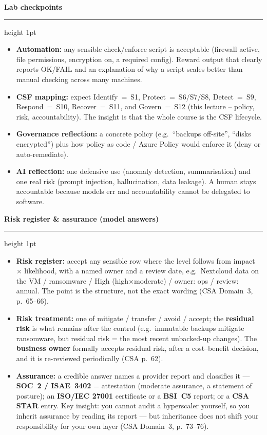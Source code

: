 \documentclass[11pt]{article}
\newcommand{\wbsection}[1]{\par\vspace{11pt}\noindent
  {\large\bfseries\color{kred}#1}\par\vspace{2pt}
  {\color{kred!35}\hrule height 1pt}\par\vspace{6pt}}
\renewcommand{\emph}[1]{\textup{#1}}
\begin{document}
\wbsection{Lab checkpoints}
\begin{itemize}
\item \textbf{Automation:} any sensible check/enforce script is acceptable (firewall active, file
      permissions, encryption on, a required config). Reward output that clearly reports OK/FAIL and an
      explanation of why a script scales better than manual checking across many machines.
\item \textbf{CSF mapping:} expect Identify~=~S1, Protect~=~S6/S7/S8, Detect~=~S9, Respond~=~S10,
      Recover~=~S11, and Govern~=~S12 (this lecture -- policy, risk, accountability). The insight is that
      the whole course \emph{is} the CSF lifecycle.
\item \textbf{Governance reflection:} a concrete policy (e.g.\ ``backups off-site'', ``disks
      encrypted'') plus how policy as code / Azure Policy would enforce it (deny or auto-remediate).
\item \textbf{AI reflection:} one defensive use (anomaly detection, summarisation) and one real risk
      (prompt injection, hallucination, data leakage). A human stays accountable because models err and
      accountability cannot be delegated to software.
\end{itemize}

\wbsection{Risk register \& assurance (model answers)}
\begin{itemize}
\item \textbf{Risk register:} accept any sensible row where the level follows from impact $\times$
      likelihood, with a named owner and a review date, e.g.\ \emph{Nextcloud data on the VM / ransomware /
      High (high$\times$moderate) / owner: ops / review: annual}. The point is the \emph{structure}, not the
      exact wording (CSA Domain~3, p.~65--66).
\item \textbf{Risk treatment:} one of \emph{mitigate / transfer / avoid / accept}; the \textbf{residual
      risk} is what remains after the control (e.g.\ immutable backups mitigate ransomware, but residual
      risk = the most recent unbacked-up changes). The \textbf{business owner} formally accepts residual
      risk, after a cost--benefit decision, and it is re-reviewed periodically (CSA p.~62).
\item \textbf{Assurance:} a credible answer names a provider report and classifies it --- \textbf{SOC~2 /
      ISAE~3402} = \emph{attestation} (moderate assurance, a statement of posture); an \textbf{ISO/IEC
      27001} certificate or a \textbf{BSI~C5} report; or a \textbf{CSA STAR} entry. Key insight: you cannot
      audit a hyperscaler yourself, so you \emph{inherit} assurance by reading its report --- but inheritance
      does not shift your responsibility for your own layer (CSA Domain~3, p.~73--76).
\end{itemize}
\end{document}
